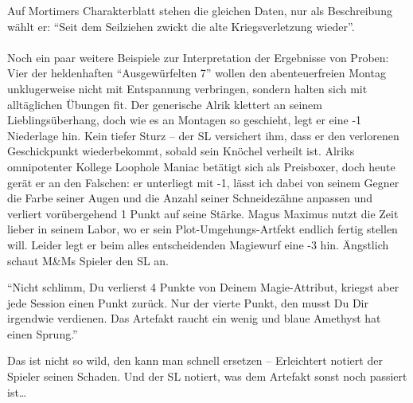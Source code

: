 Auf Mortimers Charakterblatt stehen die gleichen Daten, nur als Beschreibung wählt er: "`Seit dem Seilziehen zwickt die alte Kriegsverletzung wieder"'.
\\
\\
Noch ein paar weitere Beispiele zur Interpretation der Ergebnisse von Proben:
\\
Vier der heldenhaften "`Ausgewürfelten 7"' wollen den abenteuerfreien Montag unklugerweise nicht mit Entspannung verbringen, sondern halten sich mit alltäglichen Übungen fit. Der generische Alrik klettert an seinem Lieblingsüberhang, doch wie es an Montagen so geschieht, legt er eine -1 Niederlage hin. Kein tiefer Sturz -- der SL versichert ihm, dass er den verlorenen Geschickpunkt wiederbekommt, sobald sein Knöchel verheilt ist. Alriks omnipotenter Kollege Loophole Maniac betätigt sich als Preisboxer, doch heute gerät er an den Falschen: er unterliegt mit -1, lässt ich dabei von seinem Gegner die Farbe seiner Augen und die Anzahl seiner Schneidezähne anpassen und verliert vorübergehend 1 Punkt auf seine Stärke.
Magus Maximus nutzt die Zeit lieber in seinem Labor, wo er sein Plot-Umgehungs-Artfekt endlich fertig stellen will. Leider legt er beim alles entscheidenden Magiewurf eine -3 hin. Ängstlich schaut M\&Ms Spieler den SL an.

"`Nicht schlimm, Du verlierst 4 Punkte von Deinem Magie-Attribut, kriegst aber jede Session einen Punkt zurück. Nur der vierte Punkt, den musst Du Dir irgendwie verdienen. Das Artefakt raucht ein wenig und blaue Amethyst hat einen Sprung."'

Das ist nicht so wild, den kann man schnell ersetzen -- Erleichtert notiert der Spieler seinen Schaden. Und der SL notiert, was dem Artefakt sonst noch passiert ist\dots


